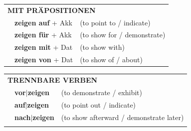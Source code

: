 \documentclass[10pt,a4paper]{revtex4-2}
\begin{document}
\begin{verbbox-acc}
 \vspace{10pt}

\begin{tabular}{lll}
      \multicolumn{3}{l}{\textbf{MIT PRÄPOSITIONEN}}\\
& \textbf{zeigen auf} + Akk & (to point to / indicate)\\
& \textbf{zeigen für} + Akk & (to show for / demonstrate)\\
& \textbf{zeigen mit} + Dat & (to show with)\\
& \textbf{zeigen von} + Dat & (to show of / about)\\
\end{tabular}
  \hfill
\begin{tabular}{lll}
      \multicolumn{3}{l}{\textbf{TRENNBARE VERBEN}}\\
 & \textbf{vor$|$zeigen} & (to demonstrate / exhibit)\\
 & \textbf{auf$|$zeigen} & (to point out / indicate)\\
 & \textbf{nach$|$zeigen} & (to show afterward / demonstrate later)\\
\vspace{10pt}
  \end{tabular}
  
  \vspace{-5pt}

\end{verbbox-acc}
\end{document}

